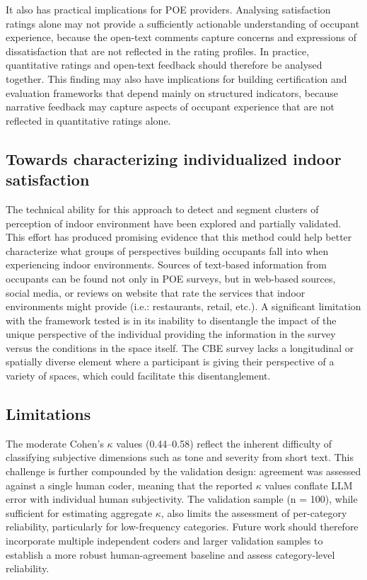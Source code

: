 \documentclass[sigconf]{acmart}
\begin{document}
It also has practical implications for POE providers. Analysing satisfaction ratings alone may not provide a sufficiently actionable understanding of occupant experience, because the open-text comments capture concerns and expressions of dissatisfaction that are not reflected in the rating profiles. In practice, quantitative ratings and open-text feedback should therefore be analysed together. This finding may also have implications for building certification and evaluation frameworks that depend mainly on structured indicators, because narrative feedback may capture aspects of occupant experience that are not reflected in quantitative ratings alone.

\subsection{Towards characterizing individualized indoor satisfaction}
The technical ability for this approach to detect and segment clusters of perception of indoor environment have been explored and partially validated. This effort has produced promising evidence that this method could help better characterize what groups of perspectives building occupants fall into when experiencing indoor environments. Sources of text-based information from occupants can be found not only in POE surveys, but in web-based sources, social media, or reviews on website that rate the services that indoor environments might provide (i.e.: restaurants, retail, etc.). A significant limitation with the framework tested is in its inability to disentangle the impact of the unique perspective of the individual providing the information in the survey versus the conditions in the space itself. The CBE survey lacks a longitudinal or spatially diverse element where a participant is giving their perspective of a variety of spaces, which could facilitate this disentanglement.

\subsection{Limitations}
The moderate Cohen's $\kappa$ values (0.44--0.58) reflect the inherent difficulty of classifying subjective dimensions such as tone and severity from short text. This challenge is further compounded by the validation design: agreement was assessed against a single human coder, meaning that the reported $\kappa$ values conflate LLM error with individual human subjectivity. The validation sample (n = 100), while sufficient for estimating aggregate $\kappa$, also limits the assessment of per-category reliability, particularly for low-frequency categories. Future work should therefore incorporate multiple independent coders and larger validation samples to establish a more robust human-agreement baseline and assess category-level reliability. 
\end{document}
